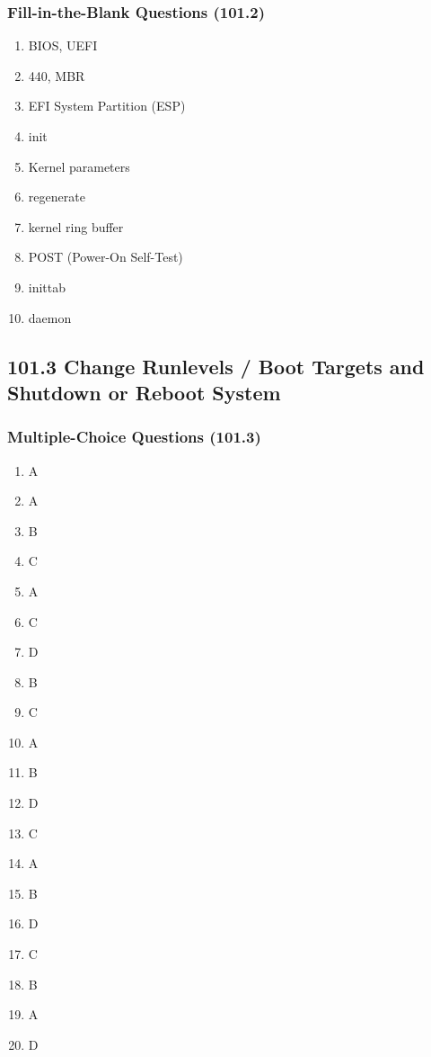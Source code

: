 \documentclass[a4paper]{report}
\begin{document}
\subsubsection*{Fill-in-the-Blank Questions (101.2)}
\begin{enumerate}[1.]
    \item BIOS, UEFI
    \item 440, MBR
    \item EFI System Partition (ESP)
    \item init
    \item Kernel parameters
    \item regenerate
    \item kernel ring buffer
    \item POST (Power-On Self-Test)
    \item inittab
    \item daemon
    \end{enumerate}



    \subsection*{101.3 Change Runlevels / Boot Targets and Shutdown or Reboot System}
    \subsubsection*{Multiple-Choice Questions (101.3)}
    \begin{enumerate}[1.]
    \item A
    \item A
    \item B
    \item C
    \item A
    \item C
    \item D
    \item B
    \item C
    \item A
    \item B
    \item D
    \item C
    \item A
    \item B
    \item D
    \item C
    \item B
    \item A
    \item D
    \end{enumerate}
\end{document}
